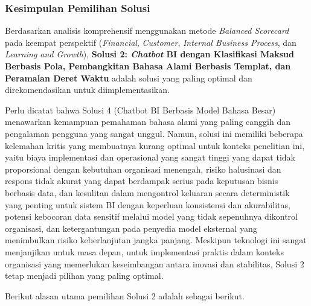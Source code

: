 \subsubsection{Kesimpulan Pemilihan Solusi}

Berdasarkan analisis komprehensif menggunakan metode \textit{Balanced Scorecard} pada keempat perspektif (\textit{Financial}, \textit{Customer}, \textit{Internal Business Process}, dan \textit{Learning and Growth}), \textbf{Solusi 2: \textit{Chatbot} BI dengan Klasifikasi Maksud Berbasis Pola, Pembangkitan Bahasa Alami Berbasis Templat, dan Peramalan Deret Waktu} adalah solusi yang paling optimal dan direkomendasikan untuk diimplementasikan.

Perlu dicatat bahwa Solusi 4 (Chatbot BI Berbasis Model Bahasa Besar) menawarkan kemampuan pemahaman bahasa alami yang paling canggih dan pengalaman pengguna yang sangat unggul. Namun, solusi ini memiliki beberapa kelemahan kritis yang membuatnya kurang optimal untuk konteks penelitian ini, yaitu biaya implementasi dan operasional yang sangat tinggi yang dapat tidak proporsional dengan kebutuhan organisasi menengah, risiko halusinasi dan respons tidak akurat yang dapat berdampak serius pada keputusan bisnis berbasis data, dan kesulitan dalam mengontrol keluaran secara deterministik yang penting untuk sistem BI dengan keperluan konsistensi dan akurabilitas, potensi kebocoran data sensitif melalui model yang tidak sepenuhnya dikontrol organisasi, dan ketergantungan pada penyedia model eksternal yang menimbulkan risiko keberlanjutan jangka panjang. Meskipun teknologi ini sangat menjanjikan untuk masa depan, untuk implementasi praktis dalam konteks organisasi yang memerlukan keseimbangan antara inovasi dan stabilitas, Solusi 2 tetap menjadi pilihan yang paling optimal.

Berikut alasan utama pemilihan Solusi 2 adalah sebagai berikut.

